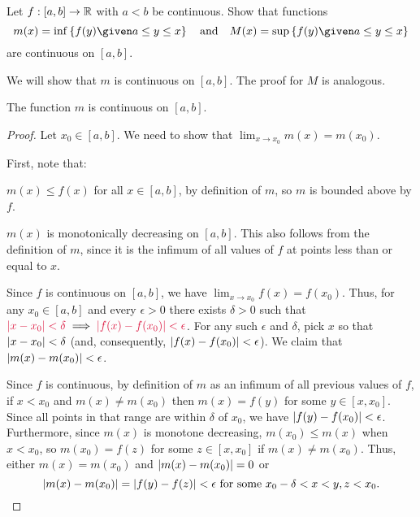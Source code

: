 \begin{problem}
  Let $f : [a, b] \to \mathbb{R}$ with $a < b$ be continuous.
  Show that functions
  \[
    m(x) = \inf \set{ f(y) \given a \leq y \leq x } \quad \text{and} \quad
    M(x) = \sup \set{ f(y) \given a \leq y \leq x }
  \]
  are continuous on $[a, b]$.
\end{problem}

\begin{answer}
  We will show that $m$ is continuous on $[a, b]$.
  The proof for $M$ is analogous.

  \begin{claim}
    The function $m$ is continuous on $[a, b]$.
    \begin{proof}
      Let $x_0 \in [a, b]$.
      We need to show that
      $\displaystyle \lim_{x \to x_0} m(x) = m(x_0)$.


      First, note that:
      \begin{enumarabic}
        \item $m(x) \leq f(x)$ for all $x \in [a, b]$, by definition of $m$,
          so $m$ is bounded above by $f$.
        \item $m(x)$ is monotonically decreasing on $[a, b]$.
          This also follows from the definition of $m$, since it is the
          infimum of all values of $f$ at points less than or equal to $x$.
      \end{enumarabic}
    
      Since $f$ is continuous on $[a, b]$, we have
      $\displaystyle \lim_{x \to x_0} f(x) = f(x_0)$.
      Thus, for any $x_0 \in [a, b]$ and every $\epsilon > 0$
      there exists $\delta > 0$ such that
      $\crim{\abs{x - x_0} < \delta} \implies \crim{\abs{f(x) - f(x_0)} < \epsilon}$.
      For any such $\epsilon$ and $\delta$, pick $x$ so that $\lvert x - x_0\rvert < \delta$
      (and, consequently, $\lvert f(x) - f(x_0)\rvert < \epsilon$).
      We claim that $\lvert m(x) - m(x_0)\rvert < \epsilon$.

      \step
        Since $f$ is continuous,
        by definition of $m$ as an infimum of all previous values of $f$,
        if $x < x_0$ and $m(x) \neq m(x_0)$
        then $m(x) = f(y)$ for some $y \in [x, x_0]$. Since all points in that range
        are within $\delta$ of $x_0$, we have $\lvert f(y) - f(x_0)\rvert < \epsilon$.
        Furthermore, since $m(x)$ is monotone decreasing,
        $m(x_0) \leq m(x)$ when $x < x_0$, so $m(x_0) = f(z)$ for some $z \in [x, x_0]$
        if $m(x) \neq m(x_0)$. Thus, either $m(x) = m(x_0)$ and $\lvert m(x) - m(x_0)\rvert = 0$
        or 
        \[ 
          \lvert m(x) - m(x_0)\rvert = \lvert f(y) - f(z)\rvert < \epsilon \text{ for some } x_0 - \delta < x < y, z < x_0.
        \]
        

\end{proof}
\end{claim}
\end{answer}
